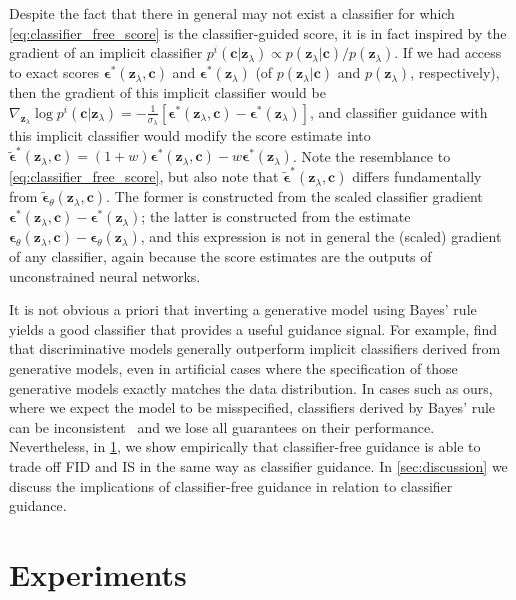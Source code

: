 \documentclass{article} %
\newcommand{\bc}{\mathbf{c}}
\newcommand{\bz}{\mathbf{z}}
\newcommand{\bepsilon}{{\boldsymbol{\epsilon}}}
\begin{document}
Despite the fact that there in general may not exist a classifier for which  \cref{eq:classifier_free_score} is the classifier-guided score, it is in fact inspired by the gradient of an implicit classifier $p^{i}(\bc | \bz_\lambda) \propto p(\bz_\lambda | \bc)/p(\bz_\lambda)$. If we had access to exact scores $\bepsilon^*(\bz_\lambda, \bc)$ and $\bepsilon^*(\bz_\lambda)$ (of $p(\bz_\lambda|\bc)$ and $p(\bz_\lambda)$, respectively), then the gradient of this implicit classifier would be $\nabla_{\bz_\lambda} \log p^{i}(\bc | \bz_\lambda) = -\frac{1}{\sigma_{\lambda}}[\bepsilon^*(\bz_\lambda, \bc) - \bepsilon^*(\bz_\lambda)]$, and classifier guidance with this implicit classifier would modify the score estimate into $\tilde{\bepsilon}^*(\bz_\lambda, \bc) = (1+w)\bepsilon^*(\bz_\lambda, \bc) - w\bepsilon^*(\bz_\lambda)$. Note the resemblance to \cref{eq:classifier_free_score}, but also note that $\tilde{\bepsilon}^*(\bz_\lambda,\bc)$ differs fundamentally from  $\tilde{\bepsilon}_\theta(\bz_\lambda,\bc)$. The former is constructed from the scaled classifier gradient $\bepsilon^*(\bz_\lambda, \bc) - \bepsilon^*(\bz_\lambda)$; the latter is constructed from the estimate $\bepsilon_\theta(\bz_\lambda, \bc) - \bepsilon_\theta(\bz_\lambda)$, and this expression is not in general the (scaled) gradient of any classifier, again because the score estimates are the outputs of unconstrained neural networks.

It is not obvious a priori that inverting a generative model using Bayes' rule yields a good classifier that provides a useful guidance signal. For example, \cite{grandvalet2004semi} find that discriminative models generally outperform implicit classifiers derived from generative models, even in artificial cases where the specification of those generative models exactly matches the data distribution. In cases such as ours, where we expect the model to be misspecified, classifiers derived by Bayes' rule can be inconsistent~\citep{grunwald2007suboptimal} and we lose all guarantees on their performance. Nevertheless, in \cref{sec:experiments}, we show empirically that classifier-free guidance is able to trade off FID and IS in the same way as classifier guidance. In \cref{sec:discussion} we discuss the implications of classifier-free guidance in relation to classifier guidance.










\section{Experiments}
\label{sec:experiments}
\end{document}
